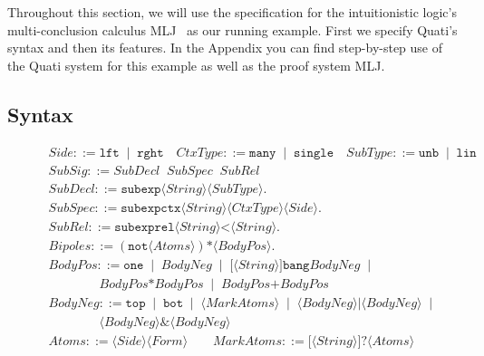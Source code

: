 \documentclass{llncs}
\newcommand{\tup}[1]{\langle#1\rangle}
\begin{document}
Throughout this section, we will use the specification for the
intuitionistic logic's multi-conclusion calculus MLJ~\cite{maehara54nmj} as our running 
example. First we specify Quati's syntax and then its features. In the Appendix
you can find step-by-step use of the Quati system for this example as well as the proof system MLJ. 

\vspace{-2mm}

\subsection{Syntax}

\begin{figure}[t]
{\small
\[
\begin{array}{lcl}
Side ::= \texttt{lft} \;\;|\;\; \texttt{rght} \quad 
CtxType ::=  \texttt{many} \;\;|\;\; \texttt{single} \quad
SubType ::=  \texttt{unb} \;\;|\;\; \texttt{lin} \\[2pt]
SubSig ::= SubDecl \;\; SubSpec \;\; SubRel \\[2pt]
SubDecl ::= \texttt{subexp} \tup{String} \tup{SubType}.\\[2pt]
SubSpec ::= \texttt{subexpctx} \tup{String} \tup{CtxType} \tup{Side}.\\[2pt]
SubRel ::= \texttt{subexprel} \tup{String} \texttt{<} \tup{String}. \\[2pt]
Bipoles ::= (\texttt{not} \tup{Atoms}) \texttt{*} \tup{BodyPos}. \\[2pt]
BodyPos ::=\texttt{one} \;\;|\;\; BodyNeg \;\;|\;\; \texttt{[}\tup{String}\texttt{]bang} BodyNeg \;\;|\;\;\\ 
        \qquad\qquad BodyPos \texttt{*} BodyPos \;\;|\;\; BodyPos \texttt{+} BodyPos \\[2pt]
BodyNeg ::= \texttt{top} \;\;|\;\; \texttt{bot} \;\;|\;\; \tup{MarkAtoms} \;\;|\;\; \tup{BodyNeg}|\tup{BodyNeg} \;\;|\;\; \\
        \qquad \qquad \tup{BodyNeg} \texttt{\&} \tup{BodyNeg}\\[2pt]
Atoms ::=\tup{Side} \tup{Form} \qquad MarkAtoms ::=  \texttt{[}\tup{String}\texttt{]?} \tup{Atoms} \\
\end{array}
\]
}
\end{figure}
\end{document}
